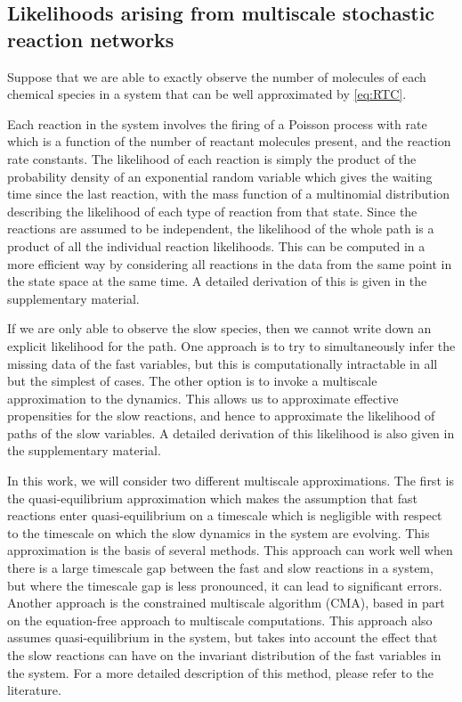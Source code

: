 \documentclass[final]{siamltex}
\newcommand{\edit}[1]{{\color{red} #1}}
\begin{document}
\subsection{Likelihoods arising from multiscale stochastic reaction networks}
Suppose that we are able to exactly observe the number of molecules of
each chemical species in a system that can be well approximated by
\eqref{eq:RTC}. \edit{Each reaction in the system involves the firing
  of a Poisson process with rate which is a function of the number of
  reactant molecules present, and the reaction rate constants. The likelihood
  of each reaction is simply the product of the probability density of
  an exponential random
  variable which gives the waiting time since the last reaction, with
  the mass function of a
  multinomial distribution describing the likelihood of each type of
  reaction from that state. Since the
  reactions are assumed to be independent, the likelihood of the whole
  path is a product of all the individual reaction likelihoods. This
  can be computed in a more efficient way by considering all reactions
  in the data from the same point in the state space at the same
  time. A detailed derivation of this is given in the
  supplementary material.

If we are only able to observe the slow species, then we cannot write
down an explicit likelihood for the path. One approach is to try to
simultaneously infer the
missing data of the fast variables, but this is computationally
intractable in all but the simplest of cases. The other option is to
invoke a multiscale approximation to the dynamics. This allows us to
approximate effective propensities for the slow reactions, and hence
to approximate the likelihood of paths of the slow variables. A
detailed derivation of this likelihood is also given in the
supplementary material.

In this work, we will consider two different multiscale
approximations. The first is the quasi-equilibrium approximation
which makes the assumption that fast reactions
enter quasi-equilibrium on a timescale which is negligible with
respect to the timescale on which the slow dynamics in the system are
evolving. This approximation is the basis of several
methods\cite{weinan2007nested,cao2005slow}. This approach can work well when there is a large timescale gap
between the fast and slow reactions in a system, but where the
timescale gap is less pronounced, it can lead to significant
errors\cite{cotter2016error}. Another approach is the
constrained multiscale algorithm (CMA)\cite{cotter2011constrained,cotter2016constrained}, based in part on the
equation-free approach to multiscale computations\cite{kevrekidis2003equation,erban2006gene}. This approach also assumes quasi-equilibrium in the
system, but takes into account the effect that the slow reactions can
have on the invariant distribution of the fast variables in the
system. For a more detailed description of this method, please refer
to the literature\cite{cotter2016constrained}.


}
\end{document}
